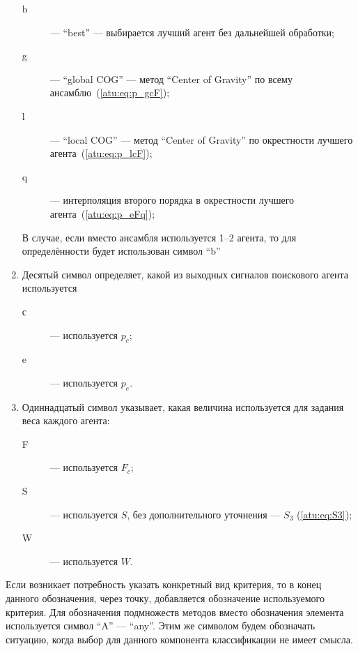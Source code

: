\begin{enumerate}
\begin{description}
      \item[b]  --- ``best'' --- выбирается лучший агент без дальнейшей обработки;

      \item[g]  --- ``global COG'' --- метод ``Center of Gravity'' по всему ансамблю~(\ref{atu:eq:p_gcF});

      \item[l] --- ``local COG'' ---   метод ``Center of Gravity'' по окрестности лучшего агента~(\ref{atu:eq:p_lcF});

      \item[q] --- интерполяция второго порядка в окрестности лучшего агента~(\ref{atu:eq:p_eFq});


    \end{description}

    В случае, если вместо ансамбля используется 1--2 агента, то для определённости будет
    использован символ ``b''


  \item
     Десятый символ определяет, какой из выходных сигналов поискового агента используется
    \begin{description}

      \item[с]  ---  используется $p_c$;

      \item[e]  --- используется $p_e$.

    \end{description}

  \item
     Одиннадцатый символ указывает, какая величина используется для задания веса каждого агента:
    \begin{description}

      \item[F]  ---  используется $F_c$;

      \item[S]  --- используется $S$, без дополнительного уточнения --- $S_{3}$ (\ref{atu:eq:S3});

      \item[W]  ---  используется $W$.

    \end{description}


\end{enumerate}

Если возникает потребность указать конкретный вид критерия,
то в конец данного обозначения, через точку, добавляется обозначение используемого критерия.
Для обозначения подмножеств методов
вместо обозначения элемента используется символ ``A'' --- ``any''.
Этим же символом будем обозначать ситуацию,
когда выбор для данного компонента классификации не имеет смысла.

